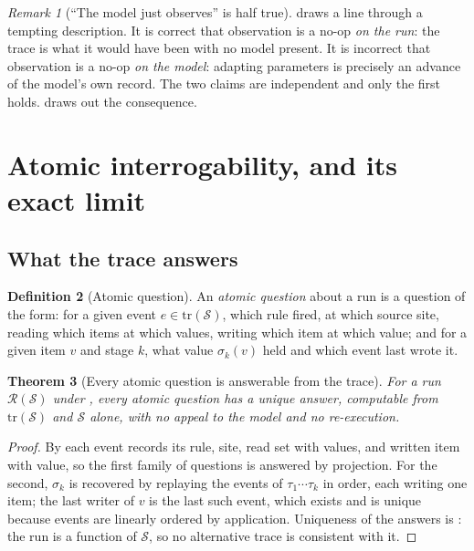 \documentclass[twocolumn,11pt,a4paper]{article}
\theoremstyle{sup}
\newtheorem{theorem}{Theorem}[section]
\theoremstyle{definition}
\newtheorem{definition}[theorem]{Definition}
\theoremstyle{remark}
\newtheorem{remark}[theorem]{Remark}
\newcommand{\Src}{\mathcal{S}}
\newcommand{\Run}{\mathcal{R}}
\newcommand{\Tr}{\mathrm{tr}}
\begin{document}
\begin{remark}[``The model just observes'' is half true]
\label{rem:just-observing}
 draws a line through a tempting description. It is
correct that observation is a no-op \emph{on the run}: the trace is what it
would have been with no model present. It is incorrect that observation is a
no-op \emph{on the model}: adapting parameters is precisely an advance of the
model's own record. The two claims are independent and only the first holds.
 draws out the consequence.
\end{remark}

\section{Atomic interrogability, and its exact limit}
\label{sec:atomic}

\subsection{What the trace answers}

\begin{definition}[Atomic question]
\label{def:atomic-q}
An \emph{atomic question} about a run is a question of the form: for a given
event $e\in\Tr(\Src)$, which rule fired, at which source site, reading which
items at which values, writing which item at which value; and for a given item
$v$ and stage $k$, what value $\sigma_k(v)$ held and which event last wrote it.
\end{definition}

\begin{theorem}[Every atomic question is answerable from the trace]
\label{thm:atomic}
For a run $\Run(\Src)$ under , every atomic question has a unique
answer, computable from $\Tr(\Src)$ and $\Src$ alone, with no appeal to the
model and no re-execution.
\end{theorem}

\begin{proof}
By  each event records its rule, site, read set with values,
and written item with value, so the first family of questions is answered by
projection. For the second, $\sigma_k$ is recovered by replaying the events of
$\tau_1\cdots\tau_k$ in order, each writing one item; the last writer of $v$ is
the last such event, which exists and is unique because events are linearly
ordered by application. Uniqueness of the answers is : the run is
a function of $\Src$, so no alternative trace is consistent with it.
\end{proof}
\end{document}
